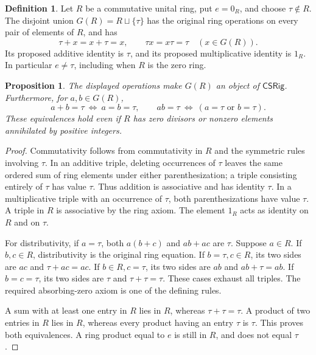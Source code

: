 \documentclass[11pt]{article}
\newtheorem{proposition}[theorem]{Proposition}
\theoremstyle{definition}
\newtheorem{definition}[theorem]{Definition}
\newcommand{\SSS}{\mathsf{CSRig}}
\begin{document}
\begin{definition}\label{def:G}
Let \(R\) be a commutative unital ring, put \(e=0_R\), and choose
\(\tau\notin R\). The disjoint union \(G(R)=R\sqcup\{\tau\}\) has the
original ring operations on every pair of elements of \(R\), and has
\[
 \tau+x=x+\tau=x,\qquad \tau x=x\tau=\tau\quad(x\in G(R)).
\]
Its proposed additive identity is \(\tau\), and its proposed multiplicative
identity is \(1_R\). In particular \(e\ne\tau\), including when \(R\) is
the zero ring.
\end{definition}

\begin{proposition}\label{prop:G}
The displayed operations make \(G(R)\) an object of \(\SSS\). Furthermore,
for \(a,b\in G(R)\),
\[
 a+b=\tau\ \Longleftrightarrow\ a=b=\tau,
 \qquad
 ab=\tau\ \Longleftrightarrow\ (a=\tau\text{ or }b=\tau).
\tag{1}\label{eq:Gsupport}
\]
These equivalences hold even if \(R\) has zero divisors or nonzero elements
annihilated by positive integers.
\end{proposition}
\begin{proof}
Commutativity follows from commutativity in \(R\) and the symmetric rules
involving \(\tau\). In an additive triple, deleting occurrences of
\(\tau\) leaves the same ordered sum of ring elements under either
parenthesization; a triple consisting entirely of \(\tau\) has value
\(\tau\). Thus addition is associative and has identity \(\tau\).
In a multiplicative triple with an occurrence of \(\tau\), both
parenthesizations have value \(\tau\). A triple in \(R\) is associative
by the ring axiom. The element \(1_R\) acts as identity on \(R\) and on
\(\tau\).

For distributivity, if \(a=\tau\), both \(a(b+c)\) and \(ab+ac\) are
\(\tau\). Suppose \(a\in R\). If \(b,c\in R\), distributivity is the
original ring equation. If \(b=\tau,c\in R\), its two sides are
\(ac\) and \(\tau+ac=ac\). If \(b\in R,c=\tau\), its two sides are
\(ab\) and \(ab+\tau=ab\). If \(b=c=\tau\), its two sides are
\(\tau\) and \(\tau+\tau=\tau\). These cases exhaust all triples.
The required absorbing-zero axiom is one of the defining rules.

A sum with at least one entry in \(R\) lies in \(R\), whereas
\(\tau+\tau=\tau\). A product of two entries in \(R\) lies in \(R\),
whereas every product having an entry \(\tau\) is \(\tau\).
This proves both equivalences. A ring product equal to \(e\) is still in
\(R\), and does not equal \(\tau\).
\end{proof}
\end{document}

